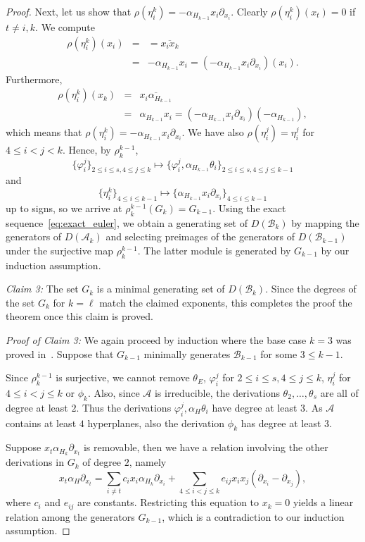 \documentclass[10pt,a4paper]{amsart}
\def\A{{\mathcal{A}}}%
\def\B{{\mathcal{B}}}%
\begin{document}
\begin{proof}
Next, let us show that $\rho(\eta_i^k)=-\alpha_{H_{k-1}} x_i\partial_{x_i}$.
Clearly $\rho(\eta_i^k)(x_t)=0$ if $t \neq i,k$. We compute 
\begin{eqnarray*}
\rho(\eta_i^k)(x_i)&=&=\overline{x_ix_k}\\
&=&-\alpha_{H_{k-1}} x_i=
(-\alpha_{H_{k-1}} x_i \partial_{x_i})(x_i).
\end{eqnarray*}
Furthermore,
\begin{eqnarray*}
\rho(\eta_i^k)(x_k)&=&\overline{x_i\alpha_{H_{k-1}}}\\
&=&\alpha_{H_{k-1}} x_i=
(-\alpha_{H_{k-1}} x_i \partial_{x_i})(-\alpha_{H_{k-1}}),
\end{eqnarray*}
which means that $\rho(\eta_i^k)=-\alpha_{H_{k-1}} x_i\partial_{x_i}$.
We have also $\rho(\eta_i^j)=\eta_i^j$ for  $4\le i < j <k$.
 Hence, by $\rho_k^{k-1}$, 
$$
\{\varphi_i^j\}_{2 \le i \le s,4 \le j \le k} \mapsto
\{\varphi_i^j,\alpha_{H_{k-1}} \theta_i\}_{2 \le i \le s,4 \le j \le k-1}
$$
and 
$$
\{\eta_i^k\}_{4 \le i \le k-1} \mapsto 
\{\alpha_{H_{k-1}} x_i \partial_{x_i}\}_{4 \le i \le k-1}
$$
up to signs, so we arrive at $\rho_k^{k-1}(G_k)=G_{k-1}$.
Using the exact sequence~\eqref{eq:exact_euler}, we obtain a generating set of $D(\B_k)$ by mapping the generators of $D(\A_k)$ and selecting preimages of the generators of $D(\B_{k-1})$ under the surjective map $\rho_k^{k-1}$.
The latter module is generated by $G_{k-1}$ by our induction assumption.

\emph{Claim 3:} The set $G_k$ is a minimal generating set of $D(\B_k)$. Since the degrees of the set $G_k$ for $k=\ell$ match the claimed exponents, this completes the proof the theorem once this claim is proved.

\emph{Proof of Claim 3:} We again proceed by induction where the base case $k=3$ was proved in~.
Suppose that $G_{k-1}$ minimally generates $\B_{k-1}$ for some $3\le k-1$.

Since $\rho_k^{k-1}$ is surjective, we cannot remove 
$\theta_E$, $\varphi_i^j$ for $2 \le i \le s, 4 \le j \le k$, $\eta_i^j$ for $4\le i < j \le k$ or $\phi_k$.
Also, since $\A$ is irreducible, the derivations $\theta_2,\dots,\theta_s$ are all of degree at least $2$.
Thus the derivations $\varphi_i^j,\alpha_H \theta_i$  have degree at least $3$.
As $\A$ contains at least $4$ hyperplanes, also the derivation $\phi_k$ has degree at least $3$.

Suppose $x_t\alpha_{H_k} \partial_{x_t}$ is removable, then we have a relation involving the other derivations in $G_k$ of degree $2$, namely
\[
	x_t\alpha_H\partial_{x_t}=
	\sum_{i \neq t} c_ix_i\alpha_{H_k}\partial_{x_i}
	+\sum_{4\le i < j \le k} e_{ij} x_i x_j(\partial_{x_i}-\partial_{x_j}),
\]
where $c_i$ and $e_{ij}$ are constants.
Restricting this equation to $x_k=0$ yields a linear relation among the generators $G_{k-1}$, which is a contradiction to our induction assumption.


\end{proof}
\end{document}

